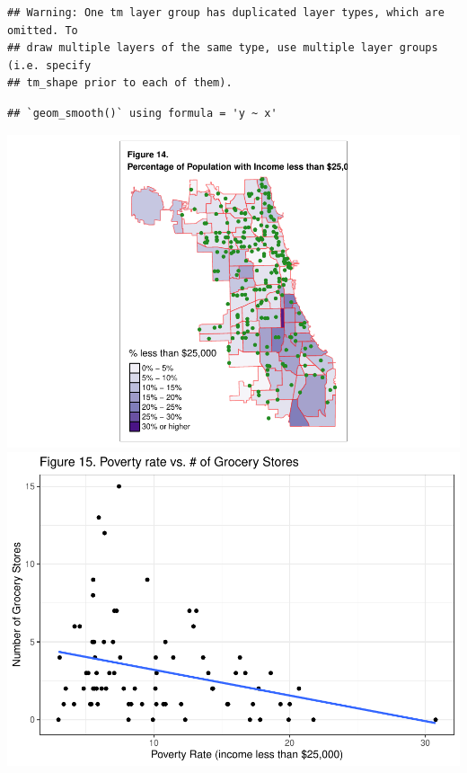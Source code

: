\documentclass[
]{article}
\newenvironment{Shaded}{\begin{snugshade}}{\end{snugshade}}
\newcommand{\AttributeTok}[1]{\textcolor[rgb]{0.13,0.29,0.53}{#1}}
\newcommand{\ConstantTok}[1]{\textcolor[rgb]{0.56,0.35,0.01}{#1}}
\newcommand{\FunctionTok}[1]{\textcolor[rgb]{0.13,0.29,0.53}{\textbf{#1}}}
\newcommand{\NormalTok}[1]{#1}
\newcommand{\SpecialCharTok}[1]{\textcolor[rgb]{0.81,0.36,0.00}{\textbf{#1}}}
\newcommand{\StringTok}[1]{\textcolor[rgb]{0.31,0.60,0.02}{#1}}
\begin{document}
\begin{verbatim}
## Warning: One tm layer group has duplicated layer types, which are omitted. To
## draw multiple layers of the same type, use multiple layer groups (i.e. specify
## tm_shape prior to each of them).
\end{verbatim}

\begin{Shaded}
\end{Shaded}

\begin{verbatim}
## `geom_smooth()` using formula = 'y ~ x'
\end{verbatim}

\includegraphics[width=0.5\linewidth]{Sam-Song_Coding-Sample_files/figure-latex/unnamed-chunk-13-1}
\includegraphics[width=0.5\linewidth]{Sam-Song_Coding-Sample_files/figure-latex/unnamed-chunk-13-2}
\end{document}
